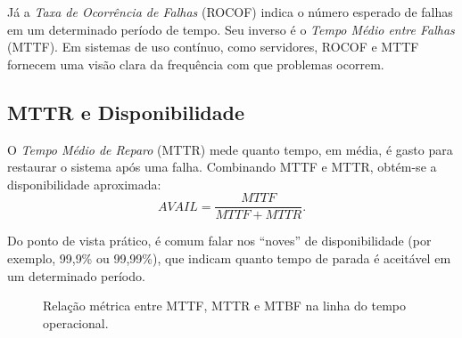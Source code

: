 \documentclass[12pt,a4paper,twoside]{report}
\begin{document}
Já a \emph{Taxa de Ocorrência de Falhas} (ROCOF) indica o número esperado de
falhas em um determinado período de tempo. Seu inverso é o \emph{Tempo Médio
entre Falhas} (MTTF). Em sistemas de uso contínuo, como servidores, ROCOF e
MTTF fornecem uma visão clara da frequência com que problemas ocorrem.

\subsection{MTTR e Disponibilidade}

O \emph{Tempo Médio de Reparo} (MTTR) mede quanto tempo, em média, é gasto
para restaurar o sistema após uma falha. Combinando MTTF e MTTR, obtém-se a
disponibilidade aproximada:
\[
AVAIL = \frac{MTTF}{MTTF + MTTR}.
\]

Do ponto de vista prático, é comum falar nos ``noves'' de disponibilidade
(por exemplo, 99{,}9\% ou 99{,}99\%), que indicam quanto tempo de parada é
aceitável em um determinado período.

\begin{figure}[h]
    \centering
    \caption{Relação métrica entre MTTF, MTTR e MTBF na linha do tempo operacional.}
\end{figure}
\end{document}
